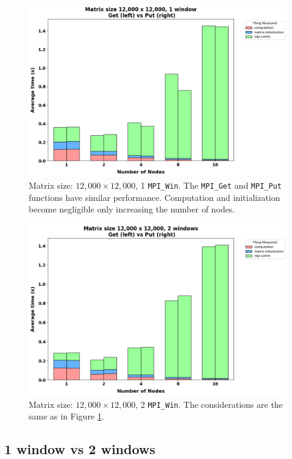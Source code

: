 \documentclass{article}
\begin{document}
    \begin{figure}
        \includegraphics[width=\textwidth]{./images/getvsput-1win-12k}
        \caption{Matrix size: $12,000 \times 12,000$, 1 \texttt{MPI\_Win}. The \texttt{MPI\_Get} and \texttt{MPI\_Put} functions have similar performance. Computation and initialization become negligible only increasing the number of nodes.}
        \label{fig:figure3}
    \end{figure}

    \begin{figure}
        \includegraphics[width=\textwidth]{./images/getvsput-2win-12k}
        \caption{Matrix size: $12,000 \times 12,000$, 2 \texttt{MPI\_Win}. The considerations are the same as in Figure \ref{fig:figure3}.}
        \label{fig:figure4}
    \end{figure}

    \newpage
    \subsection{1 window vs 2 windows}
\end{document}
